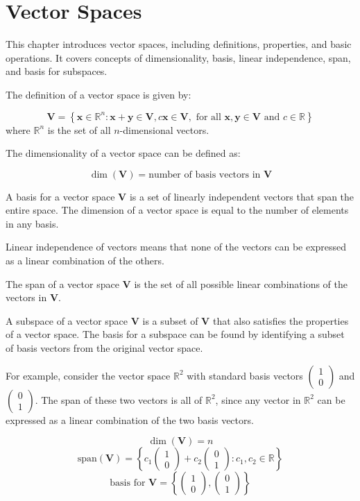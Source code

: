 \section*{Vector Spaces}

This chapter introduces vector spaces, including definitions, properties, and basic operations. It covers concepts of dimensionality, basis, linear independence, span, and basis for subspaces.

The definition of a vector space is given by:

\[
 \mathbf{V} = \left\{ \mathbf{x} \in \mathbb{R}^n : \mathbf{x} + \mathbf{y} \in \mathbf{V}, c\mathbf{x} \in \mathbf{V}, \text{ for all } \mathbf{x}, \mathbf{y} \in \mathbf{V} \text{ and } c \in \mathbb{R} \right\}
\]
where $\mathbb{R}^n$ is the set of all $n$-dimensional vectors.

The dimensionality of a vector space can be defined as:

\[
\dim(\mathbf{V}) = \text{number of basis vectors in }\mathbf{V}
\]

A basis for a vector space $\mathbf{V}$ is a set of linearly independent vectors that span the entire space. The dimension of a vector space is equal to the number of elements in any basis.

Linear independence of vectors means that none of the vectors can be expressed as a linear combination of the others.

The span of a vector space $\mathbf{V}$ is the set of all possible linear combinations of the vectors in $\mathbf{V}$.

A subspace of a vector space $\mathbf{V}$ is a subset of $\mathbf{V}$ that also satisfies the properties of a vector space. The basis for a subspace can be found by identifying a subset of basis vectors from the original vector space.

For example, consider the vector space $\mathbb{R}^2$ with standard basis vectors $\begin{pmatrix} 1 \\ 0 \end{pmatrix}$ and $\begin{pmatrix} 0 \\ 1 \end{pmatrix}$. The span of these two vectors is all of $\mathbb{R}^2$, since any vector in $\mathbb{R}^2$ can be expressed as a linear combination of the two basis vectors.

\[
\dim(\mathbf{V}) = n
\]
\[
\text{span}(\mathbf{V}) = \left\{ c_1\begin{pmatrix} 1 \\ 0 \end{pmatrix} + c_2\begin{pmatrix} 0 \\ 1 \end{pmatrix} : c_1, c_2 \in \mathbb{R} \right\}
\]
\[
\text{basis for }\mathbf{V} = \left\{ \begin{pmatrix} 1 \\ 0 \end{pmatrix}, \begin{pmatrix} 0 \\ 1 \end{pmatrix} \right\}
\]